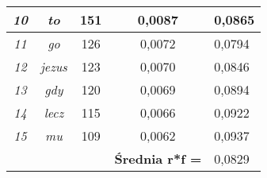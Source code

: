 \documentclass[a4paper]{article}
\begin{document}
\begin{table}
\begin{tabular}{ccc|c|l|}
\multicolumn{1}{|c|}{\textit{10}}                & \multicolumn{1}{c|}{\textit{to}}    & 151                               & 0,0087                                     & 0,0865 \\ \hline
\multicolumn{1}{|c|}{\textit{11}}                & \multicolumn{1}{c|}{\textit{go}}    & 126                               & 0,0072                                     & 0,0794 \\ \hline
\multicolumn{1}{|c|}{\textit{12}}                & \multicolumn{1}{c|}{\textit{jezus}} & 123                               & 0,0070                                     & 0,0846 \\ \hline
\multicolumn{1}{|c|}{\textit{13}}                & \multicolumn{1}{c|}{\textit{gdy}}   & 120                               & 0,0069                                     & 0,0894 \\ \hline
\multicolumn{1}{|c|}{\textit{14}}                & \multicolumn{1}{c|}{\textit{lecz}}  & 115                               & 0,0066                                     & 0,0922 \\ \hline
\multicolumn{1}{|c|}{\textit{15}}                & \multicolumn{1}{c|}{\textit{mu}}    & 109                               & 0,0062                                     & 0,0937 \\ \hline
\multicolumn{1}{l}{}                             &                                     &                                   & \textbf{Średnia r*f =}                     & 0,0829 \\ \cline{4-5} 
\end{tabular}
\end{table}
\end{document}
